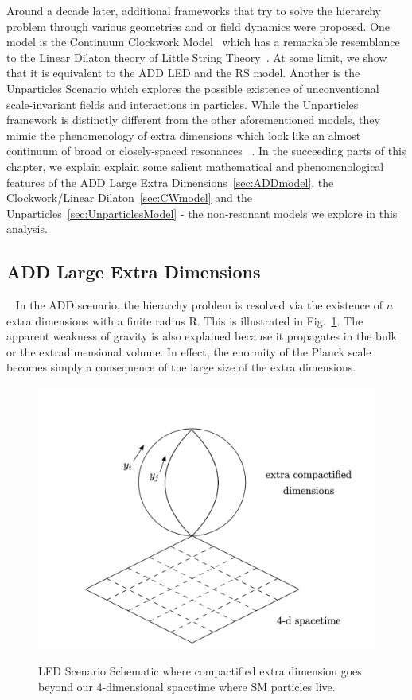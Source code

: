 Around a decade later, additional frameworks that try to solve the hierarchy problem through various geometries and or field dynamics were proposed. One model is the Continuum Clockwork Model~\cite{2Clockwork} which has a remarkable resemblance to the Linear Dilaton theory of Little String Theory~\cite{5LittleStringTheoryAtATeV}. At some limit, we show that it is equivalent to the ADD LED and the RS model. Another is the Unparticles Scenario which explores the possible existence of unconventional scale-invariant fields and interactions in particles. While the Unparticles~\cite{Georgi_2007unpar, Georgi:2007o, Georgi:2007si} framework is distinctly different from the other aforementioned models, they mimic the phenomenology of extra dimensions which look like an almost continuum of broad or closely-spaced resonances ~\cite{Folgado:2020utn}. In the succeeding parts of this chapter, we explain explain some salient mathematical and phenomenological features of the ADD Large Extra Dimensions~\ref{sec:ADDmodel}, the Clockwork/Linear Dilaton~\ref{sec:CWmodel} and the Unparticles~\ref{sec:UnparticlesModel} - the non-resonant models we explore in this analysis.

\subsection{ADD Large Extra Dimensions}~\label{sec:ADDmodel}
In the ADD scenario, the hierarchy problem is resolved via the existence of $n$ extra dimensions with a finite radius R. This is illustrated in Fig.~\ref{fig:LEDSketch}. The apparent weakness of gravity is also explained because it propagates in the bulk or the extradimensional volume. In effect, the enormity of the Planck scale becomes simply a consequence of the large size of the extra dimensions.

\begin{figure}
    \centering
    \caption{LED Scenario Schematic where compactified extra dimension goes beyond our 4-dimensional spacetime where SM particles live.~\cite{Kribs:2006mq}}
    \includegraphics[scale=0.7]{fig/LEDsketch.png}
    \label{fig:LEDSketch}
\end{figure}

